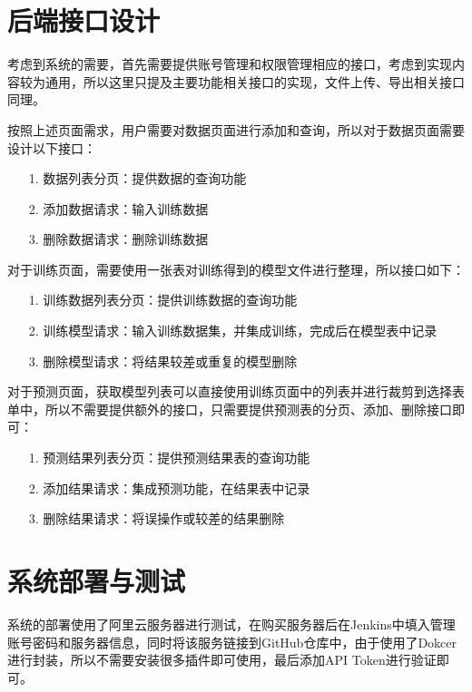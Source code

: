 \section{后端接口设计}

考虑到系统的需要，首先需要提供账号管理和权限管理相应的接口，考虑到实现内容较为通用，所以这里只提及主要功能相关接口的实现，文件上传、导出相关接口同理。

按照上述页面需求，用户需要对数据页面进行添加和查询，所以对于数据页面需要设计以下接口：

\begin{enumerate}
    \item [1.] 数据列表分页：提供数据的查询功能
    \item [2.] 添加数据请求：输入训练数据
    \item [3.] 删除数据请求：删除训练数据
\end{enumerate}

对于训练页面，需要使用一张表对训练得到的模型文件进行整理，所以接口如下：

\begin{enumerate}
    \item [1.] 训练数据列表分页：提供训练数据的查询功能
    \item [2.] 训练模型请求：输入训练数据集，并集成训练，完成后在模型表中记录
    \item [3.] 删除模型请求：将结果较差或重复的模型删除
\end{enumerate}

对于预测页面，获取模型列表可以直接使用训练页面中的列表并进行裁剪到选择表单中，所以不需要提供额外的接口，只需要提供预测表的分页、添加、删除接口即可：

\begin{enumerate}
    \item [1.] 预测结果列表分页：提供预测结果表的查询功能
    \item [2.] 添加结果请求：集成预测功能，在结果表中记录
    \item [3.] 删除结果请求：将误操作或较差的结果删除
\end{enumerate}

\section{系统部署与测试}

系统的部署使用了阿里云服务器进行测试，在购买服务器后在Jenkins中填入管理账号密码和服务器信息，同时将该服务链接到GitHub仓库中，由于使用了Dokcer进行封装，所以不需要安装很多插件即可使用，最后添加API Token进行验证即可。

